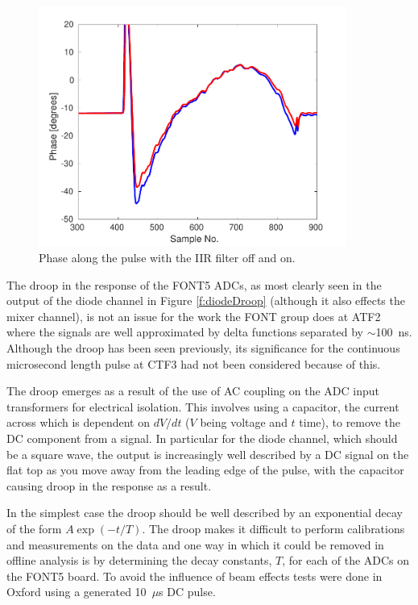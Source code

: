 \begin{figure}
  \centering
  \includegraphics[width=0.9\textwidth]{Figures/commissioning/iirPhaseFiltOffOn}
  \caption{Phase along the pulse with the IIR filter off and on.}
  \label{f:iirPhasefiltOffOn}
\end{figure}

The droop in the response of the FONT5 ADCs, as most clearly seen in the output of the diode channel in Figure \ref{f:diodeDroop} (although it also effects the mixer channel), is not an issue for the work the FONT group does at ATF2 where the signals are well approximated by delta functions separated by \(\sim\)100~ns. Although the droop has been seen previously, its significance for the continuous microsecond length pulse at CTF3 had not been considered because of this.

The droop emerges as a result of the use of AC coupling on the ADC input transformers for electrical isolation. This involves using a capacitor, the current across which is dependent on \({dV}/{dt}\) (\(V\) being voltage and \(t\) time), to remove the DC component from a signal. In particular for the diode channel, which should be a square wave, the output is increasingly well described by a DC signal on the flat top as you move away from the leading edge of the pulse, with the capacitor causing droop in the response as a result.

In the simplest case the droop should be well described by an exponential decay of the form \(A\exp\left(-t/T\right)\). The droop makes it difficult to perform calibrations and measurements on the data and one way in which it could be removed in offline analysis is by determining the decay constants, \(T\), for each of the ADCs on the FONT5 board. To avoid the influence of beam effects tests were done in Oxford using a generated 10~\(\mu\)s DC pulse.

